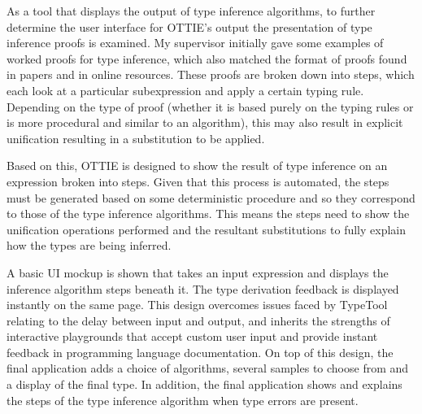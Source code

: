 \documentclass[a4paper,fleqn,oneside,12pt]{report}
\begin{document}
As a tool that displays the output of type inference algorithms, to further determine the user interface for OTTIE's output the presentation of type inference proofs is examined. My supervisor initially gave some examples of worked proofs for type inference, which also matched the format of proofs found in papers and in online resources. These proofs are broken down into steps, which each look at a particular subexpression and apply a certain typing rule. Depending on the type of proof (whether it is based purely on the typing rules or is more procedural and similar to an algorithm), this may also result in explicit unification resulting in a substitution to be applied.

Based on this, OTTIE is designed to show the result of type inference on an expression broken into steps. Given that this process is automated, the steps must be generated based on some deterministic procedure and so they correspond to those of the type inference algorithms. This means the steps need to show the unification operations performed and the resultant substitutions to fully explain how the types are being inferred.

A basic UI mockup is shown that takes an input expression and displays the inference algorithm steps beneath it. The type derivation feedback is displayed instantly on the same page. This design overcomes issues faced by TypeTool relating to the delay between input and output, and inherits the strengths of interactive playgrounds that accept custom user input and provide instant feedback in programming language documentation. On top of this design, the final application adds a choice of algorithms, several samples to choose from and a display of the final type. In addition, the final application shows and explains the steps of the type inference algorithm when type errors are present.
\end{document}
